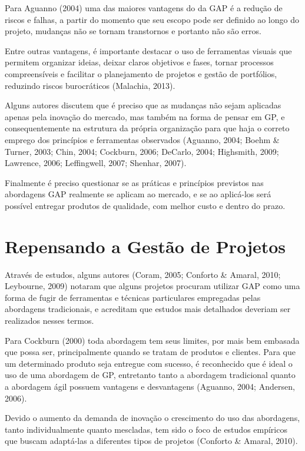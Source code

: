 Para Aguanno (2004) uma das maiores vantagens do da GAP é a redução de riscos e falhas, a partir do momento que seu escopo pode ser definido ao longo do projeto, mudanças não se tornam transtornos e portanto não são erros.

Entre outras vantagens, é importante destacar o uso de ferramentas visuais que permitem organizar ideias, deixar claros objetivos e fases, tornar processos compreensíveis e facilitar o planejamento de projetos e gestão de portfólios, reduzindo riscos burocráticos (Malachia, 2013).

Alguns autores discutem que é preciso que as mudanças não sejam aplicadas apenas pela inovação do mercado, mas também na forma de pensar em GP, e consequentemente na estrutura da própria organização para que haja o correto emprego dos princípios e ferramentas observados (Aguanno, 2004; Boehm \& Turner, 2003; Chin, 2004; Cockburn, 2006; DeCarlo, 2004; Highsmith, 2009; Lawrence, 2006; Leffingwell, 2007; Shenhar, 2007).

Finalmente é preciso questionar se as práticas e princípios previstos nas abordagens GAP realmente se aplicam ao mercado, e se ao aplicá-los será possível entregar produtos de qualidade, com melhor custo e dentro do prazo.

\section{Repensando a Gestão de Projetos}

Através de estudos, alguns autores (Coram, 2005; Conforto \& Amaral, 2010; Leybourne, 2009) notaram que alguns projetos procuram utilizar GAP como uma forma de fugir de ferramentas e técnicas particulares empregadas pelas abordagens tradicionais, e acreditam que estudos mais detalhados deveriam ser realizados nesses termos.

Para Cockburn (2000) toda abordagem tem seus limites, por mais bem embasada que possa ser, principalmente quando se tratam de produtos e clientes. Para que um determinado produto seja entregue com sucesso, é reconhecido que é ideal o uso de uma abordagem de GP, entretanto tanto a abordagem tradicional quanto a abordagem ágil possuem vantagens e desvantagens (Aguanno, 2004; Andersen, 2006).

Devido o aumento da demanda de inovação o crescimento do uso das abordagens, tanto individualmente quanto mescladas, tem sido o foco de estudos empíricos que buscam adaptá-las a diferentes tipos de projetos (Conforto \& Amaral, 2010).


